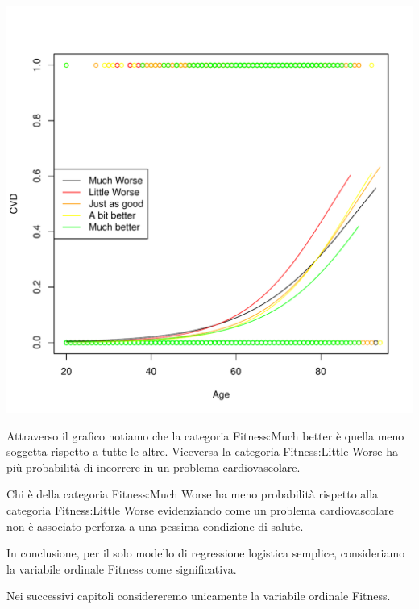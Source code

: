 \documentclass{article}\usepackage[]{graphicx}\usepackage[]{xcolor}
\makeatletter
\def\maxwidth{ %
  \ifdim\Gin@nat@width>\linewidth
    \linewidth
  \else
    \Gin@nat@width
  \fi
}
\newenvironment{kframe}{%
 \def\at@end@of@kframe{}%
 \ifinner\ifhmode%
  \def\at@end@of@kframe{\end{minipage}}%
  \begin{minipage}{\columnwidth}%
 \fi\fi%
 \def\FrameCommand##1{\hskip\@totalleftmargin \hskip-\fboxsep
 \colorbox{shadecolor}{##1}\hskip-\fboxsep
     \hskip-\linewidth \hskip-\@totalleftmargin \hskip\columnwidth}%
 \MakeFramed {\advance\hsize-\width
   \@totalleftmargin\z@ \linewidth\hsize
   \@setminipage}}%
 {\par\unskip\endMakeFramed%
 \at@end@of@kframe}
\newenvironment{knitrout}{}{} %
\makeatother
\begin{document}
\begin{knitrout}
\begin{kframe}
\begin{alltt}
\end{alltt}
\end{kframe}
\includegraphics[width=\maxwidth]{figure/RLS_Fitness_Plot-1} 
\end{knitrout}
    
    Attraverso il grafico notiamo che la categoria Fitness:Much better è quella meno
    soggetta rispetto a tutte le altre. Viceversa la categoria Fitness:Little Worse 
    ha più probabilità di incorrere in un problema cardiovascolare. \par
    
    Chi è della categoria Fitness:Much Worse ha meno probabilità rispetto alla          categoria Fitness:Little Worse evidenziando come un problema cardiovascolare
    non è associato perforza a una pessima condizione di salute. \par
    
    In conclusione, per il solo modello di regressione logistica semplice,
    consideriamo la variabile ordinale Fitness come significativa.\par
    
    Nei successivi capitoli considereremo unicamente la variabile ordinale 
    Fitness.
    
  \clearpage
\end{document}
